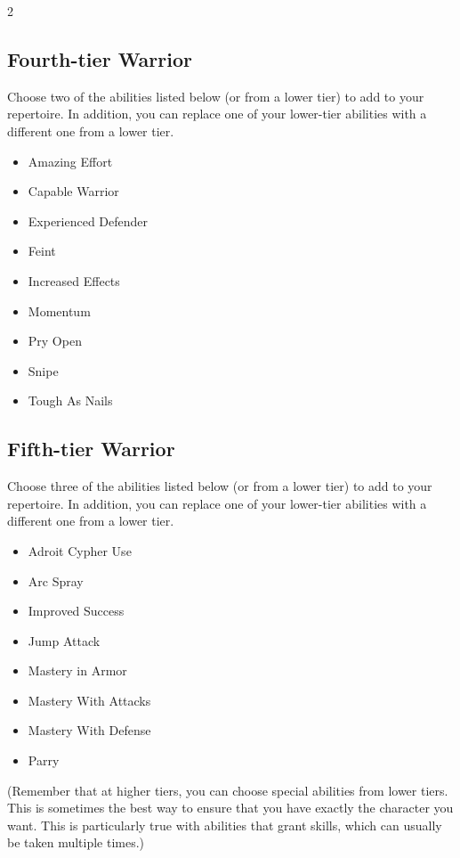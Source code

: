 \begin{multicols}{2}
\subsection{Fourth-tier Warrior}

Choose two of the abilities listed below (or from a lower tier) to add to your repertoire. In addition, you can replace one of your lower-tier abilities with a different one from a lower tier.

\begin{itemize}
\item Amazing Effort
\item Capable Warrior
\item Experienced Defender
\item Feint
\item Increased Effects
\item Momentum
\item Pry Open
\item Snipe
\item Tough As Nails
\end{itemize}

\subsection{Fifth-tier Warrior}

Choose three of the abilities listed below (or from a lower tier) to add to your repertoire. In addition, you can replace one of your lower-tier abilities with a different one from a lower tier.

\begin{itemize}
\item Adroit Cypher Use
\item Arc Spray
\item Improved Success
\item Jump Attack
\item Mastery in Armor
\item Mastery With Attacks
\item Mastery With Defense
\item Parry
\end{itemize}

(Remember that at higher tiers, you can choose special abilities from lower tiers. This is sometimes the best way to ensure that you have exactly the character you want. This is particularly true with abilities that grant skills, which can usually be taken multiple times.)


\end{multicols}
